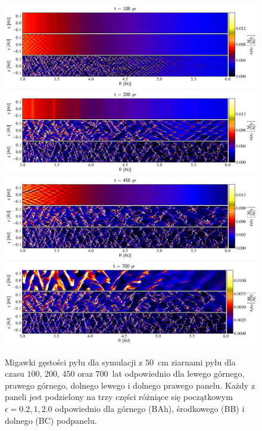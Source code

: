 \begin{figure}
   \centering
   \includegraphics[width=0.99\linewidth]{figures/fig1a}
   \includegraphics[width=0.99\linewidth]{figures/fig1b}
   \includegraphics[width=0.99\linewidth]{figures/fig1c}
   \includegraphics[width=0.99\linewidth]{figures/fig1d}
   \caption{Migawki gęstości pyłu dla symulacji z $50$~cm ziarnami pyłu
      dla czasu $100$, $200$, $450$ oraz $700$~lat odpowiednio dla lewego
      górnego, prawego górnego, dolnego lewego i dolnego prawego panelu.
      Każdy z paneli jest podzielony na trzy części różniące się początkowym 
      $\epsilon = 0.2, 1, 2.0$ odpowiednio dla górnego (BAh), środkowego (BB) i
      dolnego (BC) podpanelu.}
   \label{fig1}
\end{figure}
%

